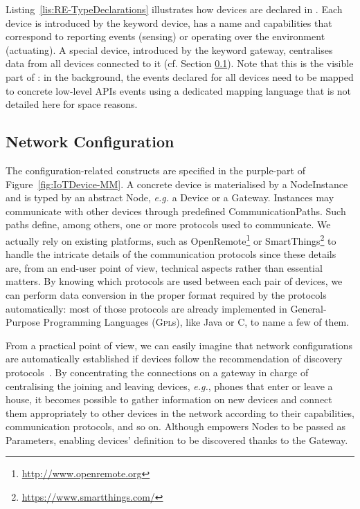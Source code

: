 Listing~\ref{lis:RE-TypeDeclarations} illustrates how devices are declared in \IOTDSL. Each device is introduced by the keyword \textsf{device}, has a name and capabilities that correspond to reporting events (\textsf{sensing}) or operating over the environment (\textsf{actuating}). A special device, introduced by the keyword \textsf{gateway}, centralises data from all devices connected to it (cf. Section \ref{sec:IoTDSL-NetworkConfiguration}). Note that this is the visible part of \IOTDSL: in the background, the events declared for all devices need to be mapped to concrete low-level APIs events using a dedicated mapping language that is not detailed here for space reasons.



\subsection{Network Configuration}
\label{sec:IoTDSL-NetworkConfiguration}

The configuration-related constructs are specified in the purple-part of Figure~\ref{fig:IoTDevice-MM}. A concrete device is materialised by a \textsf{NodeInstance} and is typed by an abstract \textsf{Node}, \textit{e.g.} a \textsf{Device} or a \textsf{Gateway}. Instances may communicate with other \IOT devices through predefined \textsf{CommunicationPath}s. Such paths define, among others, one or more protocols used to communicate. We actually rely on existing platforms, such as OpenRemote\footnote{\url{http://www.openremote.org}} or SmartThings\footnote{\url{https://www.smartthings.com/}} to handle the intricate details of the communication protocols since these details are, from an end-user point of view, technical aspects rather than essential matters. By knowing which protocols are used between each pair of devices, we can perform data conversion in the proper format required by the protocols automatically: most of those protocols are already implemented in General-Purpose Programming Languages (\textsc{Gpl}s), like Java or C, to name a few of them. %

From a practical point of view, we can easily imagine that network configurations are automatically established if devices follow the recommendation of discovery protocols~\cite{J:AlFuqaha-etAl:2014}. By concentrating the connections on a gateway in charge of centralising the joining and leaving devices, \textit{e.g.}, phones that enter or leave a house, it becomes possible to gather information on new devices and connect them appropriately to other devices in the network according to their capabilities, communication protocols, and so on. Although \IOTDSL empowers \textsf{Node}s to be passed as \textsf{Parameter}s, enabling devices' definition to be discovered thanks to the \textsf{Gateway}.

